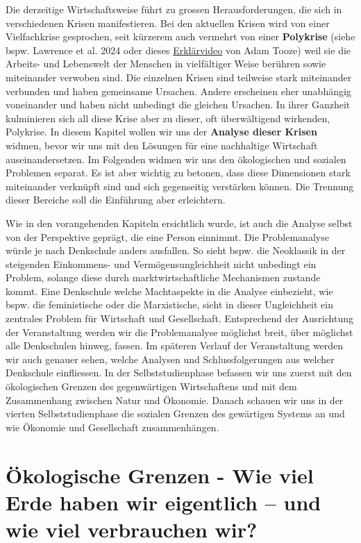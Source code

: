 \documentclass[
  nswissgerman,
  a4paper,
  DIV=11,
  numbers=noendperiod,
  oneside,
  openany]{scrreprt}
\begin{document}
Die derzeitige Wirtschaftsweise führt zu grossen Herausforderungen, die
sich in verschiedenen Krisen manifestieren. Bei den aktuellen Krisen
wird von einer Vielfachkrise gesprochen, seit kürzerem auch vermehrt von
einer \textbf{Polykrise} (siehe bspw. Lawrence et al. 2024 oder dieses
\href{https://www.weforum.org/videos/experts-explain-adam-tooze-what-is-the-polycrisis/}{Erklärvideo}
von Adam Tooze) weil sie die Arbeits- und Lebenswelt der Menschen in
vielfältiger Weise berühren sowie miteinander verwoben sind. Die
einzelnen Krisen sind teilweise stark miteinander verbunden und haben
gemeinsame Ursachen. Andere erscheinen eher unabhängig voneinander und
haben nicht unbedingt die gleichen Ursachen. In ihrer Ganzheit
kulminieren sich all diese Krise aber zu dieser, oft überwältigend
wirkenden, Polykrise. In diesem Kapitel wollen wir uns der
\textbf{Analyse dieser Krisen} widmen, bevor wir uns mit den Lösungen
für eine nachhaltige Wirtschaft auseinandersetzen. Im Folgenden widmen
wir uns den ökologischen und sozialen Problemen separat. Es ist aber
wichtig zu betonen, dass diese Dimensionen stark miteinander verknüpft
sind und sich gegenseitig verstärken können. Die Trennung dieser
Bereiche soll die Einführung aber erleichtern.

Wie in den vorangehenden Kapiteln ersichtlich wurde, ist auch die
Analyse selbst von der Perspektive geprägt, die eine Person einnimmt.
Die Problemanalyse würde je nach Denkschule anders ausfallen. So sieht
bspw. die Neoklassik in der steigenden Einkommens- und
Vermögensungleichheit nicht unbedingt ein Problem, solange diese durch
marktwirtschaftliche Mechanismen zustande kommt. Eine Denkschule welche
Machtaspekte in die Analyse einbezieht, wie bspw. die feministische oder
die Marxistische, sieht in dieser Ungleichheit ein zentrales Problem für
Wirtschaft und Gesellschaft. Entsprechend der Ausrichtung der
Veranstaltung werden wir die Problemanalyse möglichst breit, über
möglichst alle Denkschulen hinweg, fassen. Im späteren Verlauf der
Veranstaltung werden wir auch genauer sehen, welche Analysen und
Schlussfolgerungen aus welcher Denkschule einfliessen. In der
Selbststudienphase befassen wir uns zuerst mit den ökologischen Grenzen
des gegenwärtigen Wirtschaftens und mit dem Zusammenhang zwischen Natur
und Ökonomie. Danach schauen wir uns in der vierten Selbststudienphase
die sozialen Grenzen des gewärtigen Systems an und wie Ökonomie und
Gesellschaft zusammenhängen.

\section{Ökologische Grenzen - Wie viel Erde haben wir eigentlich -- und
wie viel verbrauchen
wir?}\label{uxf6kologische-grenzen---wie-viel-erde-haben-wir-eigentlich-und-wie-viel-verbrauchen-wir}
\end{document}
